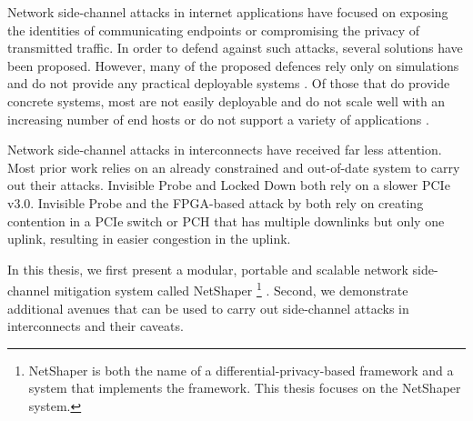 Network side-channel attacks in internet applications have focused on exposing the identities of communicating endpoints or compromising the privacy of transmitted traffic.
In order to defend against such attacks, several solutions have been proposed. 
However, many of the proposed defences rely only on simulations and do not provide any practical deployable systems \cite{abusnaina2020dfd, beckerle2022splitting, cai2014tamaraw, gong2022surakav, hou2020wf, juarez2016wtfpad, nasr2021blind, rahman2020mockingbird, shan2021dolos, wang2014supersequence, wright2009morphing}.
Of those that do provide concrete systems, most are not easily deployable and do not scale well with an increasing number of end hosts or do not support a variety of applications
\cite{cai2014csbuflo, cherubin2017llama, luo2011httpos, smith2022qcsd, wang2017walkie, mehta2022pacer, cherubin2017llama, luo2011httpos, barradas2017deltashaper, beckerle2022splitting, de2020trafficsliver}.

Network side-channel attacks in interconnects have received far less attention.
Most prior work relies on an already constrained and out-of-date system to carry out their attacks.
Invisible Probe \cite{tan2021invisible} and Locked Down \cite{side2022lockeddown} both rely on a slower PCIe v3.0.
Invisible Probe \cite{tan2021invisible} and the FPGA-based attack by \citet{giechaskiel2022cross} both rely on creating contention in a PCIe switch or PCH that has multiple downlinks but only one uplink, resulting in easier congestion in the uplink.

In this thesis, we first present a modular, portable and scalable network side-channel mitigation system called NetShaper 
\footnote{NetShaper is both the name of a differential-privacy-based framework and a system that implements the framework. This thesis focuses on the NetShaper system.} \cite{sabzi2024netshaper}.
Second, we demonstrate additional avenues that can be used to carry out side-channel attacks in interconnects and their caveats.

